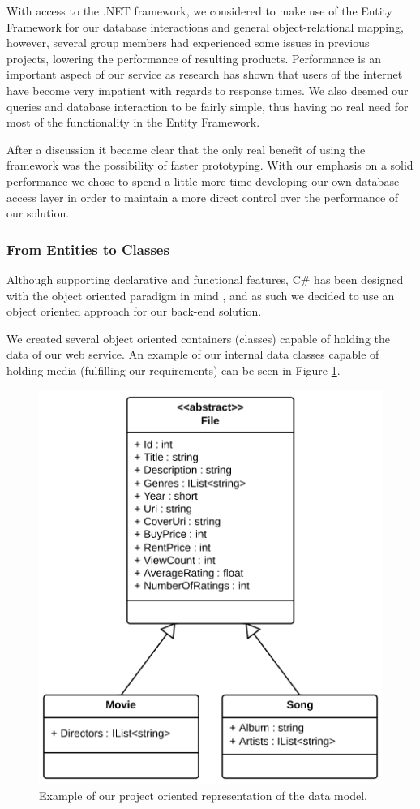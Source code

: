 With access to the .NET framework, we considered to make use of the Entity
Framework for our database interactions and general object-relational mapping,
however, several group members had experienced some issues in previous
projects, lowering the performance of resulting products. Performance is an
important aspect of our service as research has shown that users of the
internet have become very impatient with regards to response
times\cite{webusersflee}. We also deemed our queries and database interaction
to be fairly simple, thus having no real need for most of the functionality in
the Entity Framework.

After a discussion it became clear that the only real benefit of using the
framework was the possibility of faster prototyping. With our emphasis on a
solid performance we chose to spend a little more time developing our own
database access layer in order to maintain a more direct control over the
performance of our solution.


\subsubsection{From Entities to Classes}
Although supporting declarative and functional features, C\# has been designed
with the object oriented paradigm in mind \cite{csharpecma}, and as such we
decided to use an object oriented approach for our back-end solution. 

We created several object oriented containers (classes) capable of holding the
data of our web service. An example of our internal data classes capable of
holding media (fulfilling our requirements) can be seen in Figure
\ref{fig:orm}.

\begin{figure}[hbt]
	\centering
	\includegraphics[scale=0.7]{./p1design/orm.png}
	\caption{Example of our project oriented representation of the data model.}
	\label{fig:orm}
\end{figure}


